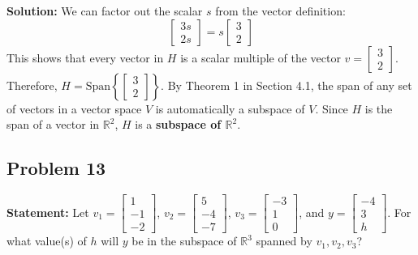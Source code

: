 \documentclass[12pt]{article}
\begin{document}
\textbf{Solution:}
We can factor out the scalar $s$ from the vector definition:
\[ \begin{bmatrix} 3s \\ 2s \end{bmatrix} = s \begin{bmatrix} 3 \\ 2 \end{bmatrix} \]
This shows that every vector in $H$ is a scalar multiple of the vector $v = \begin{bmatrix} 3 \\ 2 \end{bmatrix}$.
Therefore, $H = \text{Span}\left\{ \begin{bmatrix} 3 \\ 2 \end{bmatrix} \right\}$.
By Theorem 1 in Section 4.1, the span of any set of vectors in a vector space $V$ is automatically a subspace of $V$. Since $H$ is the span of a vector in $\mathbb{R}^2$, $H$ is a \textbf{subspace of $\mathbb{R}^2$}.

\subsection{Problem 13}
\textbf{Statement:} Let $v_1 = \begin{bmatrix} 1 \\ -1 \\ -2 \end{bmatrix}$, $v_2 = \begin{bmatrix} 5 \\ -4 \\ -7 \end{bmatrix}$, $v_3 = \begin{bmatrix} -3 \\ 1 \\ 0 \end{bmatrix}$, and $y = \begin{bmatrix} -4 \\ 3 \\ h \end{bmatrix}$. For what value(s) of $h$ will $y$ be in the subspace of $\mathbb{R}^3$ spanned by $v_1, v_2, v_3$?
\end{document}
